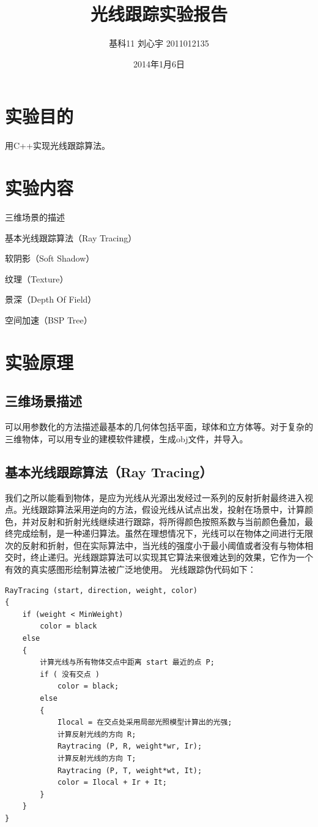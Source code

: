 \documentclass{article}
\title{光线跟踪实验报告}
\date{2014年1月6日}
\author{基科11 刘心宇 2011012135}
\makeatletter
\def\maketitle{%
  \begin{center}%
    \vspace{1em}
    \normalfont
    {\sanhao \bf \@title\par}%
    \vspace{2em}   %
    {\xiaosi \@author\par}%
    \vspace{2em}
    {\xiaosi \@date\par}%
    \vspace{3em}
    \vspace{1em}
  \end{center}%
  }
\makeatother
\begin{document}
\maketitle
\tableofcontents
\newpage
\section{实验目的}
用C++实现光线跟踪算法。
\section{实验内容}
\begin{compactitem}
\item 三维场景的描述
\item 基本光线跟踪算法（Ray Tracing）
\item 软阴影（Soft Shadow）
\item 纹理（Texture）
\item 景深（Depth Of Field）
\item 空间加速（BSP Tree）
\end{compactitem}
\section{实验原理}
\subsection{三维场景描述}
可以用参数化的方法描述最基本的几何体包括平面，球体和立方体等。对于复杂的三维物体，可以用专业的建模软件建模，生成obj文件，并导入。
\subsection{基本光线跟踪算法（Ray Tracing）}
我们之所以能看到物体，是应为光线从光源出发经过一系列的反射折射最终进入视点。光线跟踪算法采用逆向的方法，假设光线从试点出发，投射在场景中，计算颜色，并对反射和折射光线继续进行跟踪，将所得颜色按照系数与当前颜色叠加，最终完成绘制，是一种递归算法。虽然在理想情况下，光线可以在物体之间进行无限次的反射和折射，但在实际算法中，当光线的强度小于最小阈值或者没有与物体相交时，终止递归。光线跟踪算法可以实现其它算法来很难达到的效果，它作为一个有效的真实感图形绘制算法被广泛地使用。\cite{graphics} 光线跟踪伪代码如下：
\renewcommand{\lstlistingname}{Algorithm}
\begin{lstlisting}[caption=RayTracing]
RayTracing (start, direction, weight, color)
{
    if (weight < MinWeight)
        color = black
    else
    {
        计算光线与所有物体交点中距离 start 最近的点 P;
        if ( 没有交点 )
            color = black;
        else
        {
            Ilocal = 在交点处采用局部光照模型计算出的光强;
            计算反射光线的方向 R;
            Raytracing (P, R, weight*wr, Ir);
            计算反射光线的方向 T;
            Raytracing (P, T, weight*wt, It);
            color = Ilocal + Ir + It;
        }
    }
}
\end{lstlisting}\ecode
\end{document}
